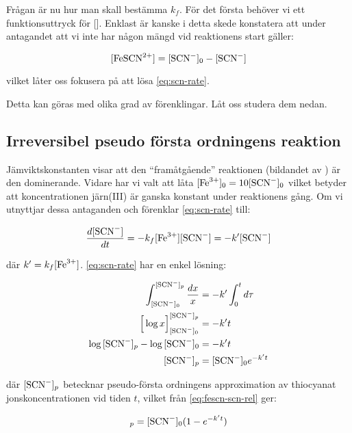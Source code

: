 Frågan är nu hur man skall bestämma $k_f$. För det första behöver vi ett funktionsuttryck
för []. Enklast är kanske i detta skede konstatera att under antagandet att
vi inte har någon mängd  vid reaktionens start gäller:

\begin{equation}
  \label{eq:fescn-scn-rel}
  [\ce{FeSCN^2+}] = [\ce{SCN-}]_0 - [\ce{SCN-}]
\end{equation}

vilket låter oss fokusera på att lösa \cref{eq:scn-rate}.

Detta kan göras med olika grad av förenklingar. Låt oss studera dem nedan.

\subsection{Irreversibel pseudo första ordningens reaktion}
Jämviktskonstanten visar att den ``framåtgående'' reaktionen (bildandet av )
är den dominerande. Vidare har vi valt att låta $[\ce{Fe^3+}]_0=10[\ce{SCN-}]_0$ vilket
betyder att koncentrationen järn(III) är ganska konstant under reaktionens gång. Om vi
utnyttjar dessa antaganden och förenklar \cref{eq:scn-rate} till:

\begin{equation}
  \label{eq:scn-pseudo-rate}
  \frac{d[\ce{SCN-}]}{dt} = -k_f[\ce{Fe^3+}][\ce{SCN-}] = -k'[\ce{SCN-}] \\
\end{equation}

där $k' = k_f[\ce{Fe^3+}]$. \cref{eq:scn-rate} har en enkel lösning:

\begin{align}
  \int_{[\ce{SCN-}]_0}^{[\ce{SCN-}]_{p}} \frac{dx}{x} &= -k'\int_0^{t}d\tau \\
  \Big[ \log{x} \Big]_{[\ce{SCN-}]_0}^{[\ce{SCN-}]_{p}} &= -k't \\
  \log{[\ce{SCN-}]_{p}} - \log{[\ce{SCN-}]_{0}} &= -k't\\
  [\ce{SCN-}]_{p} &= [\ce{SCN-}]_0e^{-k't}
\end{align}

där $[\ce{SCN-}]_{p}$ betecknar pseudo-första ordningens approximation
av thiocyanat jonskoncentrationen vid tiden $t$, vilket från \cref{eq:fescn-scn-rel}
ger:

\begin{equation}
  [\ce{FeSCN^2+}]_{p}=[\ce{SCN-}]_0(1 - e^{-k't})
\end{equation}

